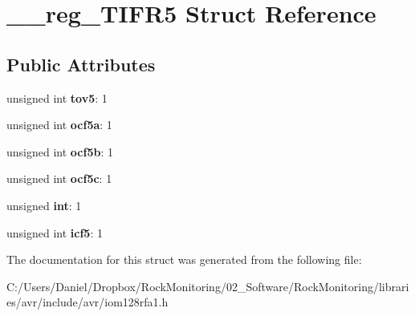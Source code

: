 \hypertarget{struct____reg___t_i_f_r5}{}\section{\+\_\+\+\_\+reg\+\_\+\+T\+I\+F\+R5 Struct Reference}
\label{struct____reg___t_i_f_r5}
\subsection*{Public Attributes}
\begin{DoxyCompactItemize}
\item 
unsigned int {\bfseries tov5}\+: 1\hypertarget{struct____reg___t_i_f_r5_a0aefb7de0fc8e1819b6f3f21ebe007d8}{}\label{struct____reg___t_i_f_r5_a0aefb7de0fc8e1819b6f3f21ebe007d8}

\item 
unsigned int {\bfseries ocf5a}\+: 1\hypertarget{struct____reg___t_i_f_r5_a2acc4db8556959a4083ec1fb4cc80982}{}\label{struct____reg___t_i_f_r5_a2acc4db8556959a4083ec1fb4cc80982}

\item 
unsigned int {\bfseries ocf5b}\+: 1\hypertarget{struct____reg___t_i_f_r5_afebedb49b57d28280d8c80c95b6801e0}{}\label{struct____reg___t_i_f_r5_afebedb49b57d28280d8c80c95b6801e0}

\item 
unsigned int {\bfseries ocf5c}\+: 1\hypertarget{struct____reg___t_i_f_r5_a0536f204e8fd4a9f411a158c7f3bdaeb}{}\label{struct____reg___t_i_f_r5_a0536f204e8fd4a9f411a158c7f3bdaeb}

\item 
unsigned {\bfseries int}\+: 1\hypertarget{struct____reg___t_i_f_r5_a50a5efebc911b9680b0b98a2c15ead31}{}\label{struct____reg___t_i_f_r5_a50a5efebc911b9680b0b98a2c15ead31}

\item 
unsigned int {\bfseries icf5}\+: 1\hypertarget{struct____reg___t_i_f_r5_a91e2640096e2ed35cf20dade129cea75}{}\label{struct____reg___t_i_f_r5_a91e2640096e2ed35cf20dade129cea75}

\end{DoxyCompactItemize}


The documentation for this struct was generated from the following file\+:\begin{DoxyCompactItemize}
\item 
C\+:/\+Users/\+Daniel/\+Dropbox/\+Rock\+Monitoring/02\+\_\+\+Software/\+Rock\+Monitoring/libraries/avr/include/avr/iom128rfa1.\+h\end{DoxyCompactItemize}
